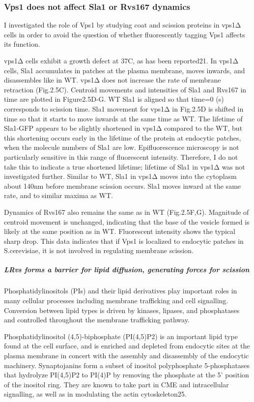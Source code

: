 			\subsubsection{Vps1 does not affect Sla1 or Rvs167 dynamics }
	\vspace{5mm}
I investigated the role of Vps1 by studying coat and scission proteins in vps1Δ cells in order to avoid the question of whether fluorescently tagging Vps1 affects its function. 

vps1Δ cells exhibit a growth defect at 37C, as has been reported21. In vps1Δ cells, Sla1 accumulates in patches at the plasma membrane, moves inwards, and disassembles like in WT. vps1Δ does not increase the rate of membrane retraction (Fig.2.5C). Centroid movements and intensities of Sla1 and Rvs167 in time are plotted in Figure2.5D-G. WT Sla1 is aligned so that time=0 (s) corresponds to scission time. Sla1 movement for vps1Δ in Fig.2.5D is shifted in time so that it starts to move inwards at the same time as WT. The lifetime of Sla1-GFP appears to be slightly shortened in vps1Δ compared to the WT, but this shortening occurs early in the lifetime of the protein at endocytic patches, when the molecule numbers of Sla1 are low. Epifluorescence microscopy is not particularly sensitive in this range of fluorescent intensity. Therefore, I do not take this to indicate a true shortened lifetime; lifetime of Sla1 in vps1Δ was not investigated further. Similar to WT, Sla1 in vps1Δ moves into the cytoplasm about 140nm before membrane scission occurs. Sla1 moves inward at the same rate, and to similar maxima as WT. 

Dynamics of Rvs167 also remains the same as in WT (Fig.2.5F,G). Magnitude of centroid movement is unchanged, indicating that the base of the vesicle formed is likely at the same position as in WT. Fluorescent intensity shows the typical sharp drop. This data indicates that if Vps1 is localized to endocytic patches in S.cerevisiae, it is not involved in regulating membrane scission.  

	\subparagraph{ LRvs forms a barrier for lipid diffusion, generating forces for scission
}
Phosphatidylinositols (PIs) and their lipid derivatives play important roles in many cellular processes including membrane trafficking and cell signalling. Conversion between lipid types is driven by kinases, lipases, and phosphatases and controlled throughout the membrane trafficking pathway. 

Phosphatidylinositol (4,5)-biphosphate (PI(4,5)P2) is an important lipid type found at the cell surface, and is enriched and depleted from endocytic sites at the plasma membrane in concert with the assembly and disassembly of the endocytic machinery. Synaptojanins form a subset of inositol polyphosphate 5-phosphatases that hydrolyze PI(4,5)P2 to PI(4)P by removing the phosphate at the 5’ position of the inositol ring. They are known to take part in CME and intracellular signalling, as well as in modulating the actin cytoskeleton25. 

